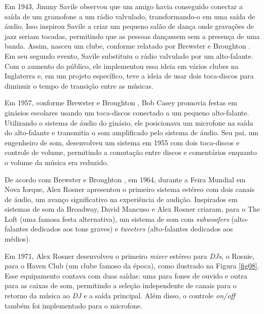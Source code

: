 Em 1943, Jimmy Savile observou que um amigo havia conseguido conectar a saída de um gramofone a um rádio valvulado, transformando-o em uma saída de áudio. Isso inspirou Savile a criar um pequeno salão de dança onde gravações de jazz seriam tocadas, permitindo que as pessoas dançassem sem a presença de uma banda. Assim, nasceu um clube, conforme relatado por Brewster e Broughton \cite{lastnight}. Em seu segundo evento, Savile substituiu o rádio valvulado por um alto-falante. Com o aumento do público, ele implementou essa ideia em vários clubes na Inglaterra e, em um projeto específico, teve a ideia de usar dois toca-discos para diminuir o tempo de transição entre as músicas.

Em 1957, conforme Brewster e Broughton \cite{lastnight}, Bob Casey promovia festas em ginásios escolares usando um toca-discos conectado a um pequeno alto-falante. Utilizando o sistema de áudio do ginásio, ele posicionava um microfone na saída do alto-falante e transmitia o som amplificado pelo sistema de áudio. Seu pai, um engenheiro de som, desenvolveu um sistema em 1955 com dois toca-discos e controle de volume, permitindo a comutação entre discos e comentários enquanto o volume da música era reduzido.

De acordo com Brewster e Broughton \cite{lastnight}, em 1964, durante a Feira Mundial em Nova Iorque, Alex Rosner apresentou o primeiro sistema estéreo com dois canais de áudio, um avanço significativo na experiência de audição. Inspirados em sistemas de som da Broadway, David Mancuso e Alex Rosner criaram, para o The Loft (uma famosa festa alternativa), um sistema de som com \textit{subwoofers} (alto-falantes dedicados aos tons graves) e \textit{tweeters} (alto-falantes dedicados aos médios).

Em 1971, Alex Rosner desenvolveu o primeiro \textit{mixer} estéreo para \textit{DJs}, o Rosnie, para o Haven Club (um clube famoso da época), como ilustrado na Figura \ref{fig08}. Esse equipamento contava com duas saídas: uma para fones de ouvido e outra para as caixas de som, permitindo a seleção independente de canais para o retorno da música ao \textit{DJ} e a saída principal. Além disso, o controle \textit{on/off} também foi implementado para o microfone.

